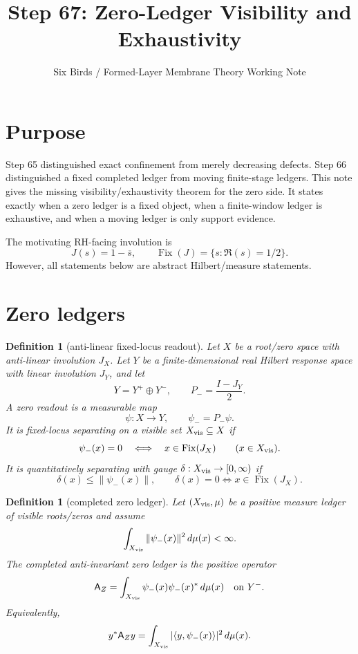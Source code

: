 \documentclass[11pt]{article}
\title{Step 67: Zero-Ledger Visibility and Exhaustivity}
\author{Six Birds / Formed-Layer Membrane Theory Working Note}
\date{}
\newtheorem{definition}[theorem]{Definition}
\newcommand{\Fix}{\operatorname{Fix}}
\begin{document}
\maketitle

\section{Purpose}
Step 65 distinguished exact confinement from merely decreasing defects.  Step 66 distinguished a fixed completed ledger from moving finite-stage ledgers.  This note gives the missing visibility/exhaustivity theorem for the zero side.  It states exactly when a zero ledger is a fixed object, when a finite-window ledger is exhaustive, and when a moving ledger is only support evidence.

The motivating RH-facing involution is
\[
        J(s)=1-\overline{s},
        \qquad \Fix(J)=\{s:\Re(s)=1/2\}.
\]
However, all statements below are abstract Hilbert/measure statements.

\section{Zero ledgers}

\begin{definition}[anti-linear fixed-locus readout]
Let $X$ be a root/zero space with anti-linear involution $J_X$. Let $Y$ be a finite-dimensional real Hilbert response space with linear involution $J_Y$, and let
\[
        Y=Y^+\oplus Y^-,
        \qquad P_-=\frac{I-J_Y}{2}.
\]
A zero readout is a measurable map
\[
        \psi:X\to Y,
        \qquad \psi_-=P_-\psi.
\]
It is \emph{fixed-locus separating} on a visible set $X_{\rm vis}\subseteq X$ if
\[
        \psi_-(x)=0 \quad\Longleftrightarrow\quad x\in \Fix(J_X)
        \qquad (x\in X_{\rm vis}).
\]
It is quantitatively separating with gauge $\delta:X_{\rm vis}\to[0,\infty)$ if
\[
        \delta(x)\le \|\psi_-(x)\|,
        \qquad
        \delta(x)=0 \Longleftrightarrow x\in\Fix(J_X).
\]
\end{definition}

\begin{definition}[completed zero ledger]
Let $(X_{\rm vis},\mu)$ be a positive measure ledger of visible roots/zeros and assume
\[
        \int_{X_{\rm vis}}\|\psi_-(x)\|^2\,d\mu(x)<\infty.
\]
The completed anti-invariant zero ledger is the positive operator
\[
        \mathsf A_Z
        =\int_{X_{\rm vis}} \psi_-(x)\psi_-(x)^*\,d\mu(x)
        \quad\text{on }Y^-.
\]
Equivalently,
\[
        y^*\mathsf A_Z y
        =\int_{X_{\rm vis}} |\langle y,\psi_-(x)\rangle|^2\,d\mu(x).
\]
\end{definition}
\end{document}
